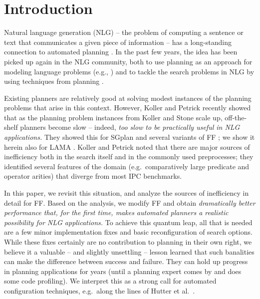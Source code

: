
\section{Introduction} \label{sec:introduction}

Natural language generation (NLG) -- the problem of computing a
sentence or text that communicates a given piece of information -- has
a long-standing connection to automated planning \cite{perrault80}. In
the past few years, the idea has been picked up again in the NLG
community, both to use planning as an approach for modeling language
problems (e.g., \cite{Steedman-Petrick:07}) and to tackle the search
problems in NLG by using techniques from planning \cite{KolSto07}.

Existing planners are relatively good at solving modest instances of
the planning problems that arise in this context. However, Koller and
Petrick 
recently showed that as the planning problem instances from Koller and
Stone  scale up, off-the-shelf planners become
slow -- indeed, {\em too slow to be practically useful in NLG
  applications.} They showed this for SGplan and several variants of
FF \cite{HoffmannNebel01}; we show it herein also for LAMA
\cite{richter:etal:aaai-08}. Koller and Petrick noted that there are
major sources of inefficiency both in the search itself and in the
commonly used preprocesses; they identified several features of the
domain (e.g.\ comparatively large predicate and operator arities) that
diverge from most IPC benchmarks.

In this paper, we revisit this situation, and analyze the sources of
inefficiency in detail for FF. Based on the analysis, we modify FF and
obtain {\em dramatically better performance that, for the first time,
  makes automated planners a realistic possibility for NLG
  applications.} To achieve this quantum leap, all that is needed are
a few minor implementation fixes and basic reconfiguration of search
options. While these fixes certainly are no contribution to planning
in their own right, we believe it a valuable -- and slightly
unsettling -- lesson learned that such banalities can make the
difference between success and failure. They can hold up progress in
planning applications for years (until a planning expert comes by and
does some code profiling). We interpret this as a strong call for
automated configuration techniques, e.g.\ along the lines of Hutter et
al.\ .


